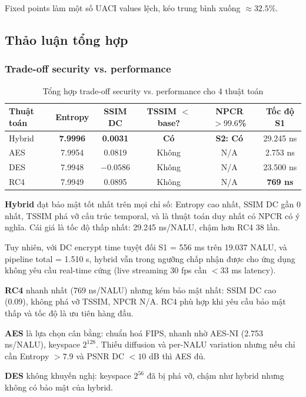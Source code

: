 Fixed points làm một số UACI values lệch, kéo trung bình xuống $\approx 32.5\%$.

\subsection{Thảo luận tổng hợp}

\subsubsection{Trade-off security vs. performance}

\begin{table}[ht]
\centering
\caption{Tổng hợp trade-off security vs. performance cho 4 thuật toán}
\label{tab:tradeoff}
\begin{tabular}{lccccc}
\toprule
Thuật toán & Entropy & SSIM DC & TSSIM $<$ base? & NPCR $>99.6$\% & Tốc độ S1 \\
\midrule
Hybrid & \textbf{7.9996} & \textbf{0.0031} & \textbf{Có} & \textbf{S2: Có} & 29.245 ns \\
AES    & 7.9954 & 0.0819 & Không & N/A & 2.753 ns \\
DES    & 7.9948 & $-0.0586$ & Không & N/A & 23.500 ns \\
RC4    & 7.9949 & 0.0895 & Không & N/A & \textbf{769 ns} \\
\bottomrule
\end{tabular}
\end{table}

\textbf{Hybrid} đạt bảo mật tốt nhất trên mọi chỉ số: Entropy cao nhất, SSIM DC
gần 0 nhất, TSSIM phá vỡ cấu trúc temporal, và là thuật toán duy nhất có NPCR
có ý nghĩa. Cái giá là tốc độ thấp nhất: 29.245 ns/NALU, chậm hơn RC4 38 lần.

Tuy nhiên, với DC encrypt time tuyệt đối S1 = 556 ms trên 19.037 NALU, và
pipeline total = 1.510 s, hybrid vẫn trong ngưỡng chấp nhận được cho ứng dụng
không yêu cầu real-time cứng (live streaming 30 fps cần $< 33$ ms latency).

\textbf{RC4} nhanh nhất (769 ns/NALU) nhưng kém bảo mật nhất: SSIM DC cao (0.09),
không phá vỡ TSSIM, NPCR N/A. RC4 phù hợp khi yêu cầu bảo mật thấp và tốc độ
là ưu tiên hàng đầu.

\textbf{AES} là lựa chọn cân bằng: chuẩn hoá FIPS, nhanh nhờ AES-NI (2.753 ns/NALU),
keyspace $2^{128}$. Thiếu diffusion và per-NALU variation nhưng nếu chỉ cần
Entropy $> 7.9$ và PSNR DC $< 10$ dB thì AES đủ.

\textbf{DES} không khuyến nghị: keyspace $2^{56}$ đã bị phá vỡ, chậm như hybrid
nhưng không có bảo mật của hybrid.

